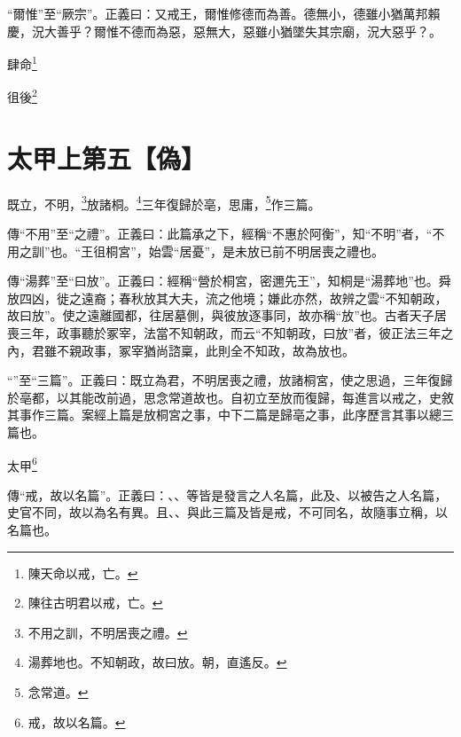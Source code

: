 {\noindent\shu{}\fzkt “爾惟”至“厥宗”。正義曰：又戒王，爾惟修德而為善。德無小，德雖小猶萬邦賴慶，況大善乎？爾惟不德而為惡，惡無大，惡雖小猶墜失其宗廟，況大惡乎？。 \par}

肆命\footnote{陳天命以戒，亡。}

徂後\footnote{陳往古明君以戒，亡。}

\section{太甲上第五【偽】}


既立，不明，\footnote{不用之訓，不明居喪之禮。}放諸桐。\footnote{湯葬地也。不知朝政，故曰放。朝，直遙反。}三年復歸於亳，思庸，\footnote{念常道。}作三篇。


{\noindent\zhuan{}\fzbyks 傳“不用”至“之禮”。正義曰：此篇承之下，經稱“不惠於阿衡”，知“不明”者，“不用之訓”也。“王徂桐宮”，始雲“居憂”，是未放已前不明居喪之禮也。 \par}

{\noindent\zhuan{}\fzbyks 傳“湯葬”至“曰放”。正義曰：經稱“營於桐宮，密邇先王”，知桐是“湯葬地”也。舜放四凶，徙之遠裔；春秋放其大夫，流之他境；嫌此亦然，故辨之雲“不知朝政，故曰放”。使之遠離國都，往居墓側，與彼放逐事同，故亦稱“放”也。古者天子居喪三年，政事聽於冢宰，法當不知朝政，而云“不知朝政，曰放”者，彼正法三年之內，君雖不親政事，冢宰猶尚諮稟，此則全不知政，故為放也。 \par}

{\noindent\shu{}\fzkt “”至“三篇”。正義曰：既立為君，不明居喪之禮，放諸桐宮，使之思過，三年復歸於亳都，以其能改前過，思念常道故也。自初立至放而復歸，每進言以戒之，史敘其事作三篇。案經上篇是放桐宮之事，中下二篇是歸亳之事，此序歷言其事以總三篇也。 \par}

太甲\footnote{戒，故以名篇。}

{\noindent\zhuan{}\fzbyks 傳“戒，故以名篇”。正義曰：、、等皆是發言之人名篇，此及、以被告之人名篇，史官不同，故以為名有異。且、、與此三篇及皆是戒，不可同名，故隨事立稱，以名篇也。 \par}

